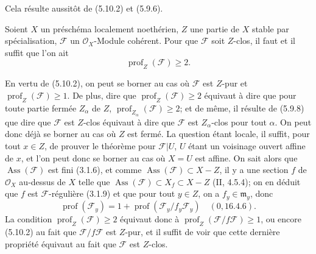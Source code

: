 Cela résulte aussitôt de (5.10.2) et (5.9.6).

\begin{theorem}[5.10.5]
\label{IV.2.s5.10.5-fr}
Soient $X$ un préschéma localement noethérien, $Z$ une partie de $X$ stable
par spécialisation, $\mathcal F$ un $\mathcal O_X$-Module cohérent. Pour que
$\mathcal F$ soit $Z$-clos, il faut et il suffit que l'on ait
\[
\operatorname{prof}_Z(\mathcal F)\geq2.
\]
\end{theorem}

En vertu de (5.10.2), on peut se borner au cas où $\mathcal F$ est $Z$-pur
et $\operatorname{prof}_Z(\mathcal F)\geq1$. De plus, dire que
$\operatorname{prof}_Z(\mathcal F)\geq2$ équivaut à dire que pour toute partie
fermée $Z_\alpha$ de $Z$, $\operatorname{prof}_{Z_\alpha}(\mathcal F)\geq2$;
et de même, il résulte de (5.9.8) que dire que $\mathcal F$ est $Z$-clos
équivaut à dire que $\mathcal F$ est $Z_\alpha$-clos pour tout $\alpha$. On
peut donc déjà se borner au cas où $Z$ est fermé. La question étant locale,
il suffit, pour tout $x\in Z$, de prouver le théorème pour $\mathcal F|U$,
$U$ étant un voisinage ouvert affine de $x$, et l'on peut donc se borner au
cas où $X=U$ est affine. On sait alors que $\operatorname{Ass}(\mathcal F)$
est fini (3.1.6), et comme
$\operatorname{Ass}(\mathcal F)\subset X-Z$, il y a une section $f$ de
$\mathcal O_X$ au-dessus de $X$ telle que
$\operatorname{Ass}(\mathcal F)\subset X_f\subset X-Z$ (II, 4.5.4); on en
déduit que $f$ est $\mathcal F$-régulière (3.1.9) et que pour tout $y\in Z$,
on a $f_y\in\mathfrak m_y$, donc
\[
\operatorname{prof}(\mathcal F_y)
=1+\operatorname{prof}(\mathcal F_y/f_y\mathcal F_y)
\quad(0, 16.4.6).
\]
La condition $\operatorname{prof}_Z(\mathcal F)\geq2$ équivaut donc à
$\operatorname{prof}_Z(\mathcal F/f\mathcal F)\geq1$, ou encore (5.10.2) au
fait que $\mathcal F/f\mathcal F$ est $Z$-pur, et il suffit de voir que cette
dernière propriété équivaut au fait que $\mathcal F$ est $Z$-clos.

